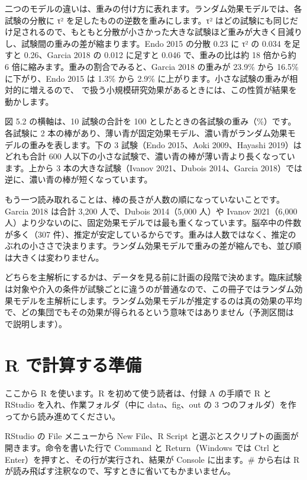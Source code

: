 二つのモデルの違いは、重みの付け方に表れます。ランダム効果モデルでは、各試験の分散に τ² を足したものの逆数を重みにします。τ² はどの試験にも同じだけ足されるので、もともと分散が小さかった大きな試験ほど重みが大きく目減りし、試験間の重みの差が縮まります。Endo 2015 の分散 0.23 に τ² の 0.034 を足すと 0.26、Garcia 2018 の 0.012 に足すと 0.046 で、重みの比は約 18 倍から約 6 倍に縮みます。重みの割合でみると、Garcia 2018 の重みが 23.9\% から 16.5\% に下がり、Endo 2015 は 1.3\% から 2.9\% に上がります。小さな試験の重みが相対的に増えるので、 で扱う小規模研究効果があるときには、この性質が結果を動かします。


図 5.2 の横軸は、10 試験の合計を 100 としたときの各試験の重み（\%）です。各試験に 2 本の棒があり、薄い青が固定効果モデル、濃い青がランダム効果モデルの重みを表します。下の 3 試験（Endo 2015、Aoki 2009、Hayashi 2019）はどれも合計 600 人以下の小さな試験で、濃い青の棒が薄い青より長くなっています。上から 3 本の大きな試験（Ivanov 2021、Dubois 2014、Garcia 2018）では逆に、濃い青の棒が短くなっています。

もう一つ読み取れることは、棒の長さが人数の順になっていないことです。Garcia 2018 は合計 3,200 人で、Dubois 2014（5,000 人）や Ivanov 2021（6,000 人）より少ないのに、固定効果モデルでは最も重くなっています。脳卒中の件数が多く（307 件）、推定が安定しているからです。重みは人数ではなく、推定のぶれの小ささで決まります。ランダム効果モデルで重みの差が縮んでも、並び順は大きくは変わりません。

どちらを主解析にするかは、データを見る前に計画の段階で決めます。臨床試験は対象や介入の条件が試験ごとに違うのが普通なので、この冊子ではランダム効果モデルを主解析にします。ランダム効果モデルが推定するのは真の効果の平均で、どの集団でもその効果が得られるという意味ではありません（予測区間は  で説明します）。

\section{R で計算する準備}
\label{sec:05-5}

ここから R を使います。R を初めて使う読者は、付録 A の手順で R と RStudio を入れ、作業フォルダ（中に data、fig、out の 3 つのフォルダ）を作ってから読み進めてください。

RStudio の File メニューから New File、R Script と選ぶとスクリプトの画面が開きます。命令を書いた行で Command と Return（Windows では Ctrl と Enter）を押すと、その行が実行され、結果が Console に出ます。\# から右は R が読み飛ばす注釈なので、写すときに省いてもかまいません。

